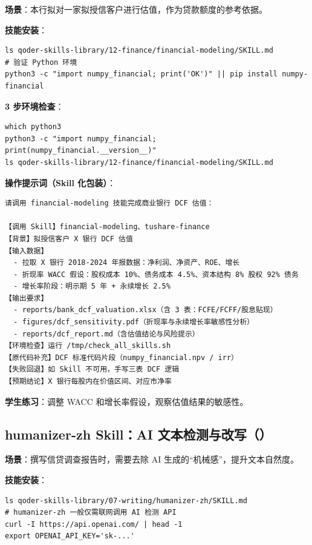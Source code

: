 \textbf{场景}：本行拟对一家拟授信客户进行估值，作为贷款额度的参考依据。

\textbf{技能安装}：

\begin{lstlisting}[style=shell]
ls qoder-skills-library/12-finance/financial-modeling/SKILL.md
# 验证 Python 环境
python3 -c "import numpy_financial; print('OK')" || pip install numpy-financial
\end{lstlisting}

\textbf{3 步环境检查}：
\begin{lstlisting}[style=shell]
which python3
python3 -c "import numpy_financial; print(numpy_financial.__version__)"
ls qoder-skills-library/12-finance/financial-modeling/SKILL.md
\end{lstlisting}

\textbf{操作提示词（Skill 化包装）}：

\begin{lstlisting}
请调用 financial-modeling 技能完成商业银行 DCF 估值：

【调用 Skill】financial-modeling、tushare-finance
【背景】拟授信客户 X 银行 DCF 估值
【输入数据】
  - 拉取 X 银行 2018-2024 年报数据：净利润、净资产、ROE、增长
  - 折现率 WACC 假设：股权成本 10%、债务成本 4.5%、资本结构 8% 股权 92% 债务
  - 增长率阶段：明示期 5 年 + 永续增长 2.5%
【输出要求】
  - reports/bank_dcf_valuation.xlsx（含 3 表：FCFE/FCFF/股息贴现）
  - figures/dcf_sensitivity.pdf（折现率与永续增长率敏感性分析）
  - reports/dcf_report.md（含估值结论与风险提示）
【环境检查】运行 /tmp/check_all_skills.sh
【原代码补充】DCF 标准代码片段（numpy_financial.npv / irr）
【失败回退】如 Skill 不可用，手写三表 DCF 逻辑
【预期结论】X 银行每股内在价值区间、对应市净率
\end{lstlisting}

\textbf{学生练习}：调整 WACC 和增长率假设，观察估值结果的敏感性。

\subsection{humanizer-zh Skill：AI 文本检测与改写（）}

\textbf{场景}：撰写信贷调查报告时，需要去除 AI 生成的“机械感”，提升文本自然度。

\textbf{技能安装}：

\begin{lstlisting}[style=shell]
ls qoder-skills-library/07-writing/humanizer-zh/SKILL.md
# humanizer-zh 一般仅需联网调用 AI 检测 API
curl -I https://api.openai.com/ | head -1
export OPENAI_API_KEY='sk-...'
\end{lstlisting}

